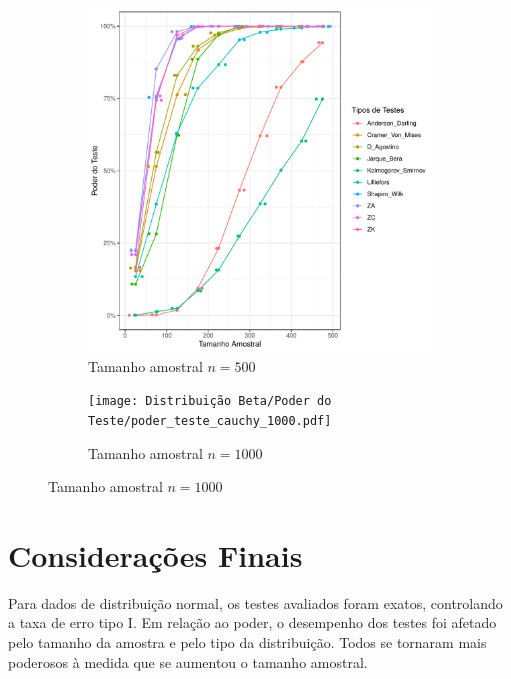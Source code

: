 \documentclass[a4paper,11pt]{article} %
\begin{document}
\begin{figure}[H]
    \vspace{0.5cm} %
    \begin{subfigure}[b]{0.45\textwidth}
        \centering
        \includegraphics[width=\textwidth]{Distribuição Beta/Poder do Teste/poder_teste_beta_500.pdf}
        \caption{Tamanho amostral \(n = 500\)}
        \label{fig:cauchy_poder_500}
    \end{subfigure}
    \hfill
    \begin{subfigure}[b]{0.45\textwidth}
        \centering
        \texttt{[image: Distribuição Beta/Poder do Teste/poder\_teste\_cauchy\_1000.pdf]}
        \caption{Tamanho amostral \(n = 1000\)}
        \label{fig:cauchy_poder_1000}
    \end{subfigure}
\end{figure}





\section{Considerações Finais}

Para dados de distribuição normal, os testes avaliados foram exatos, controlando a taxa de erro tipo I. Em relação ao poder, o desempenho dos testes foi afetado pelo tamanho da amostra e pelo tipo da distribuição. Todos se tornaram mais poderosos à medida que se aumentou o tamanho amostral. 
\end{document}
